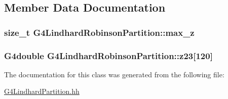\subsection{Member Data Documentation}
\subsubsection[{\texorpdfstring{max\+\_\+z}{max_z}}]{\setlength{\rightskip}{0pt plus 5cm}size\+\_\+t G4\+Lindhard\+Robinson\+Partition\+::max\+\_\+z}\hypertarget{classG4LindhardRobinsonPartition_a1a9008d3cf7dc340f9d1f8e80ad501ef}{}\label{classG4LindhardRobinsonPartition_a1a9008d3cf7dc340f9d1f8e80ad501ef}
\subsubsection[{\texorpdfstring{z23}{z23}}]{\setlength{\rightskip}{0pt plus 5cm}G4double G4\+Lindhard\+Robinson\+Partition\+::z23\mbox{[}120\mbox{]}}\hypertarget{classG4LindhardRobinsonPartition_a8e695188dd4b287ec6d4d03c004479b2}{}\label{classG4LindhardRobinsonPartition_a8e695188dd4b287ec6d4d03c004479b2}


The documentation for this class was generated from the following file\+:\begin{DoxyCompactItemize}
\item 
\hyperlink{G4LindhardPartition_8hh}{G4\+Lindhard\+Partition.\+hh}\end{DoxyCompactItemize}
